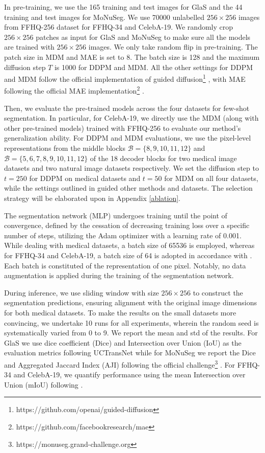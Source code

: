 \documentclass{article} \usepackage{iclr2024_conference,times}
\begin{document}
In pre-training, we use the 165 training and test images for GlaS and the 44 training and test images for MoNuSeg. We use 70000 unlabelled $256 \times 256$ images from FFHQ-256 dataset for FFHQ-34 and CelebA-19. We randomly crop $256 \times 256$ patches as input for GlaS and MoNuSeg to make sure all the models are trained with $256 \times 256$ images. We only take random flip in pre-training. The patch size in MDM and MAE is set to 8. The batch size is 128 and the maximum diffusion step $T$ is 1000 for DDPM and MDM. All the other settings for DDPM and MDM follow the official implementation of guided diffusion\footnote{https://github.com/openai/guided-diffusion} \citep{DBLP:conf/nips/DhariwalN21}, with MAE following the official MAE implementation\footnote{https://github.com/facebookresearch/mae} \citep{DBLP:conf/cvpr/HeCXLDG22}. 

Then, we evaluate the pre-trained models across the four datasets for few-shot segmentation. In particular, for CelebA-19, we directly use the MDM (along with other pre-trained models) trained with FFHQ-256 to evaluate our method’s generalization ability.
For DDPM and MDM evaluations, we use the pixel-level representations from the middle blocks $\mathcal{B}=\{8, 9, 10, 11, 12\}$ and $\mathcal{B}=\{5, 6, 7, 8, 9, 10, 11, 12\}$ of the 18 decoder blocks for two medical image datasets and two natural image datasets respectively. We set the diffusion step to \(t=250\) for DDPM on medical datasets and \(t=50\) for MDM on all four datasets, while the settings outlined in \citet{DBLP:conf/iclr/BaranchukVRKB22} guided other methods and datasets. The selection strategy will be elaborated upon in Appendix \ref{ablation}. 

The segmentation network (MLP) undergoes training until the point of convergence, defined by the cessation of decreasing training loss over a specific number of steps, utilizing the Adam optimizer with a learning rate of 0.001. While dealing with medical datasets, a batch size of 65536 is employed,  whereas for FFHQ-34 and CelebA-19, a batch size of 64 is adopted in accordance with \citet{DBLP:conf/iclr/BaranchukVRKB22}. Each batch is constituted of the representation of one pixel. Notably, no data augmentation is applied during the training of the segmentation network. 

During inference, we use sliding window with size $256 \times 256$ to construct the segmentation predictions, ensuring alignment with the original image dimensions for both medical datasets. To make the results on the small datasets more convincing, we undertake 10 runs for all experiments, wherein the random seed is systematically varied from 0 to 9. We report the mean and std of the results. For GlaS we use dice coefficient (Dice) and Intersection over Union (IoU) as the evaluation metrics following UCTransNet \citep{DBLP:conf/aaai/Wang0WZ22} while for MoNuSeg we report the Dice and Aggregated Jaccard Index (AJI) following the official challenge\footnote{https://monuseg.grand-challenge.org} \citep{DBLP:journals/tmi/KumarVSBVS17,DBLP:journals/tmi/KumarVAZOTCHLHW20}. For FFHQ-34 and CelebA-19, we quantify performance using the mean Intersection over Union (mIoU) following \citet{DBLP:conf/iclr/BaranchukVRKB22}.
\end{document}
